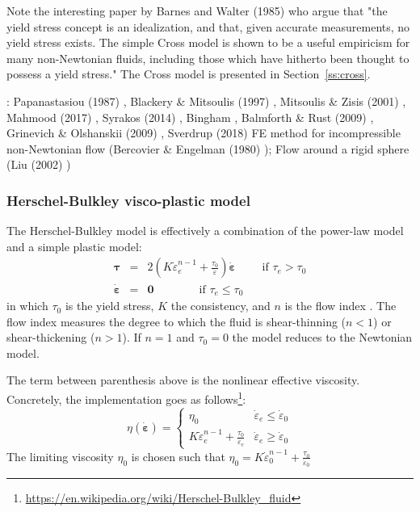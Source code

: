 Note the interesting paper by Barnes and Walter (1985) \cite{bawa85} who argue that 
"the yield stress concept is an idealization, and that, given accurate
measurements, no yield stress exists. The simple Cross model is shown to be a
useful empiricism for many non-Newtonian fluids, including those which have
hitherto been thought to possess a yield stress." The Cross model is presented 
in Section~\ref{ss:cross}.
 

\Literature: 
Papanastasiou (1987) \cite{papa87}, Blackery \& Mitsoulis (1997) \cite{blmi97},
Mitsoulis \& Zisis (2001) \cite{mizi01}, Mahmood \etal (2017) \cite{maky17},
Syrakos \etal (2014) \cite{syga14}, Bingham \cite{bingham}, Balmforth \& Rust (2009) \cite{baru09}, 
Grinevich \& Olshanskii (2009) \cite{grol09}, Sverdrup \etal (2018) \cite{svna18}
FE method for incompressible non-Newtonian flow (Bercovier \& Engelman (1980) \cite{been80});
Flow around a rigid sphere (Liu \etal (2002) \cite{limd02})

\subsubsection{Herschel-Bulkley visco-plastic model}

The Herschel-Bulkley model is effectively a combination of the power-law model and 
a simple plastic model:
\begin{eqnarray}
{\bm \tau} &=& 2 \left(  K \dot{\varepsilon}_e^{n-1} 
+ \frac{\tau_0}{\dot{\varepsilon}}\right)\dot{\bm \varepsilon} \qquad \text{ if } {\tau}_{e}>\tau_0 \\
\dot{\bm \varepsilon} &=& {\bm 0} \qquad\qquad \text{if }{\tau}_{e} \leq \tau_0 
\end{eqnarray}
in which $\tau_0$ is the yield stress, $K$ the consistency, and $n$ is the flow index  \cite{demj04}.
The flow index measures the degree to which the fluid is shear-thinning ($n<1$) or shear-thickening ($n>1$).
If $n=1$ and $\tau_0=0$ the model reduces to the Newtonian model. 

The term between parenthesis above is the nonlinear effective viscosity. 
Concretely, the implementation goes as 
follows\footnote{\url{https://en.wikipedia.org/wiki/Herschel-Bulkley_fluid}}:
\begin{equation}
\eta(\dot{\bm \varepsilon}) = 
\left\{
\begin{array}{cc}
\eta_0 & \dot{\varepsilon}_e\leq \dot{\varepsilon}_0 \\ 
K \dot{\varepsilon}_e^{n-1} + \frac{\tau_0}{\dot{\varepsilon}_e} & \dot{\varepsilon}_e \geq \dot{\varepsilon}_0
\end{array}
\right.
\end{equation}
The limiting viscosity $\eta_0$ is chosen such that 
$\eta_0 =  K \dot{\varepsilon}_0^{n-1} + \frac{\tau_0}{\dot{\varepsilon}_0}$

